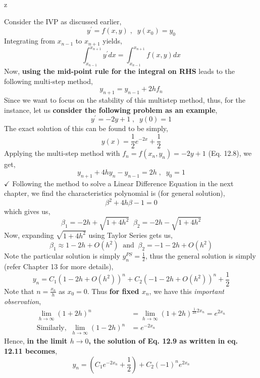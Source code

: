 z\documentclass[a4paper,12pt,twoside]{book}
\renewcommand{\d}[0]{\prime}
\begin{document}
Consider the IVP as discussed earlier, 
\[y^\prime = f(x,y)\;,\;\;y(x_0) = y_0\]
Integrating from $x_{n-1}$ to $x_{n+1}$ yields,
\[\int_{x_{n-1}}^{x_{n+1}} y^\prime dx = \int_{x_{n-1}}^{x_{n+1}} f(x,y)dx\]
Now, \textbf{using the mid-point rule for the integral on RHS} leads to the following multi-step method,
\begin{equation}
    y_{n+1} = y_{n-1} + 2hf_n
\end{equation}
Since we want to focus on the stability of this multistep method, thus, for the instance, let us \textbf{consider the following problem as an example},
\begin{equation}
    y^\d = -2y +1\;,\;\;y(0) = 1
\end{equation}
The exact solution of this can be found to be simply,
\begin{equation}
    y(x) = \frac{1}{2}e^{-2x} + \frac{1}{2}
\end{equation}
Applying the multi-step method with $f_n = f(x_n,y_n) = -2y+1$ (Eq. 12.8), we get, 
\[ y_{n+1} + 4hy_n - y_{n-1} = 2h\;,\;\;y_0 = 1 \]
$\boxed{\checkmark}$ Following the method to solve a Linear Difference Equation in the next chapter, we find the characteristics polynomial is (for general solution),
\[\beta^2 + 4h\beta -1 = 0\]
which gives us,
\[\beta_1 = -2h+\sqrt{1+4h^2}\;\;\beta_2 = -2h - \sqrt{1+4h^2}\]
Now, expanding $\sqrt{1+4h^2}$ using Taylor Series gets us,
\[\beta_1 \approx 1 - 2h + O(h^2) \;\;\text{and}\;\; \beta_2 = -1-2h + O(h^2)\]
Note the particular solution is simply $y_n^{PS} = \frac{1}{2}$, thus the general solution is simply (refer Chapter 13 for more details),
\begin{equation}
    y_n = C_1(1-2h+O(h^2))^n + C_2(-1-2h+O(h^2))^n + \frac{1}{2}
\end{equation}
Note that $n = \frac{x_n}{h}$ as $x_0 = 0$. Thus \textbf{for fixed $x_n$}, we have this \textit{important observation},
\begin{equation*}
    \begin{split}
        \underset{h\to \infty}{\lim} (1+2h)^n &= \underset{h\to \infty}{\lim} (1+2h)^{\frac{1}{2h} 2x_n} = e^{2x_n}\\
    \text{Similarly,}\; \; \underset{h\to \infty}{\lim} (1-2h)^n &= e^{-2x_n}
    \end{split}
\end{equation*}
Hence, \textbf{in the limit $h \to 0$, the solution of Eq. 12.9 as written in eq. 12.11 becomes},
\begin{equation}
    y_n = \left(C_1 e^{-2x_n} + \frac{1}{2}\right) + C_2 (-1)^ne^{2x_n}
\end{equation}
\end{document}
